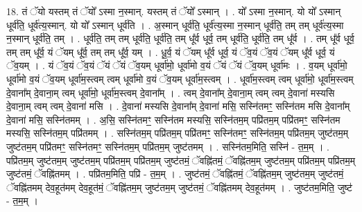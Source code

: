 \documentclass[17pt]{extarticle}
\begin{document}
18. तं ॅयो यस्तम् तं ॅयो᳚ ऽस्मा न॒स्मान्. यस्तम् तं ॅयो᳚ ऽस्मान् । . यो᳚ ऽस्मा न॒स्मान्. यो यो᳚ ऽस्मान् धूर्व॑ति॒ धूर्व॑त्य॒स्मान्. यो यो᳚ ऽस्मान् धूर्व॑ति । . अ॒स्मान् धूर्व॑ति॒ धूर्व॑त्य॒स्मा न॒स्मान् धूर्व॑ति॒ तम् तम् धूर्व॑त्य॒स्मा न॒स्मान् धूर्व॑ति॒ तम् । . धूर्व॑ति॒ तम् तम् धूर्व॑ति॒ धूर्व॑ति॒ तम् धू᳚र्व धूर्व॒ तम् धूर्व॑ति॒ धूर्व॑ति॒ तम् धू᳚र्व । . तम् धू᳚र्व धूर्व॒ तम् तम् धू᳚र्व॒ यं ॅयम् धू᳚र्व॒ तम् तम् धू᳚र्व॒ यम् । . धू॒र्व॒ यं ॅयम् धू᳚र्व धूर्व॒ यं ॅव॒यं ॅव॒यं ॅयम् धू᳚र्व धूर्व॒ यं ॅव॒यम् । . यं ॅव॒यं ॅव॒यं ॅयं ॅयं ॅव॒यम् धूर्वा॑मो॒ धूर्वा॑मो व॒यं ॅयं ॅयं ॅव॒यम् धूर्वा॑मः । . व॒यम् धूर्वा॑मो॒ धूर्वा॑मो व॒यं ॅव॒यम् धूर्वा॑म॒स्त्वम् त्वम् धूर्वा॑मो व॒यं ॅव॒यम् धूर्वा॑म॒स्त्वम् । . धूर्वा॑म॒स्त्वम् त्वम् धूर्वा॑मो॒ धूर्वा॑म॒स्त्वम् दे॒वाना᳚म् दे॒वाना॒म् त्वम् धूर्वा॑मो॒ धूर्वा॑म॒स्त्वम् दे॒वाना᳚म् । . त्वम् दे॒वाना᳚म् दे॒वाना॒म् त्वम् त्वम् दे॒वाना॑ मस्यसि दे॒वाना॒म् त्वम् त्वम् दे॒वाना॑ मसि । . दे॒वाना॑ मस्यसि दे॒वाना᳚म् दे॒वाना॑ मसि॒ सस्नि॑तमꣳ॒॒ सस्नि॑तम मसि दे॒वाना᳚म् दे॒वाना॑ मसि॒ सस्नि॑तमम् । . अ॒सि॒ सस्नि॑तमꣳ॒॒ सस्नि॑तम मस्यसि॒ सस्नि॑तम॒म् पप्रि॑तम॒म् पप्रि॑तमꣳ॒॒ सस्नि॑तम मस्यसि॒ सस्नि॑तम॒म् पप्रि॑तमम् । . सस्नि॑तम॒म् पप्रि॑तम॒म् पप्रि॑तमꣳ॒॒ सस्नि॑तमꣳ॒॒ सस्नि॑तम॒म् पप्रि॑तम॒म् जुष्ट॑तम॒म् जुष्ट॑तम॒म् पप्रि॑तमꣳ॒॒ सस्नि॑तमꣳ॒॒ सस्नि॑तम॒म् पप्रि॑तम॒म् जुष्ट॑तमम् । . सस्नि॑तम॒मिति॒ सस्नि॑ - त॒म॒म् । . पप्रि॑तम॒म् जुष्ट॑तम॒म् जुष्ट॑तम॒म् पप्रि॑तम॒म् पप्रि॑तम॒म् जुष्ट॑तमं॒ ॅवह्नि॑तमं॒ ॅवह्नि॑तम॒म् जुष्ट॑तम॒म् पप्रि॑तम॒म् पप्रि॑तम॒म् जुष्ट॑तमं॒ ॅवह्नि॑तमम् । . पप्रि॑तम॒मिति॒ पप्रि॑ - त॒म॒म् । . जुष्ट॑तमं॒ ॅवह्नि॑तमं॒ ॅवह्नि॑तम॒म् जुष्ट॑तम॒म् जुष्ट॑तमं॒ ॅवह्नि॑तमम् देव॒हूत॑मम् देव॒हूत॑मं॒ ॅवह्नि॑तम॒म् जुष्ट॑तम॒म् जुष्ट॑तमं॒ ॅवह्नि॑तमम् देव॒हूत॑मम् । . जुष्ट॑तम॒मिति॒ जुष्ट॑ - त॒म॒म् । \newline
\end{document}
